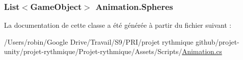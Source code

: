 \subsubsection[{Spheres}]{\setlength{\rightskip}{0pt plus 5cm}List$<$Game\+Object$>$ Animation.\+Spheres\hspace{0.3cm}{\ttfamily [get]}}\label{class_animation_a54aef17d1bdc63728b435debc61a516f}


La documentation de cette classe a été générée à partir du fichier suivant \+:\begin{DoxyCompactItemize}
\item 
/\+Users/robin/\+Google Drive/\+Travail/\+S9/\+P\+R\+I/projet rythmique github/projet-\/unity/projet-\/rythmique/\+Projet-\/rythmique/\+Assets/\+Scripts/\hyperlink{_animation_8cs}{Animation.\+cs}\end{DoxyCompactItemize}
